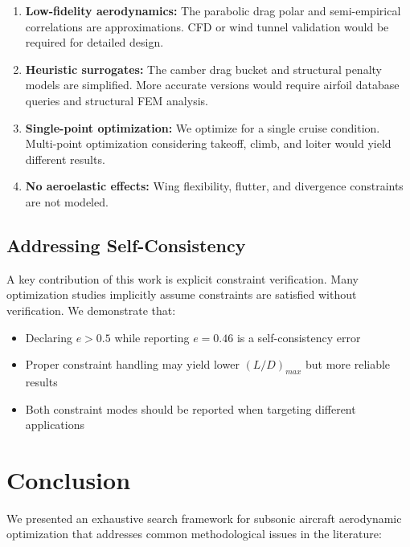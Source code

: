 \documentclass[11pt,a4paper]{article}
\begin{document}
\begin{enumerate}
    \item \textbf{Low-fidelity aerodynamics:} The parabolic drag polar and semi-empirical correlations are approximations. CFD or wind tunnel validation would be required for detailed design.
    
    \item \textbf{Heuristic surrogates:} The camber drag bucket and structural penalty models are simplified. More accurate versions would require airfoil database queries and structural FEM analysis.
    
    \item \textbf{Single-point optimization:} We optimize for a single cruise condition. Multi-point optimization considering takeoff, climb, and loiter would yield different results.
    
    \item \textbf{No aeroelastic effects:} Wing flexibility, flutter, and divergence constraints are not modeled.
\end{enumerate}

\subsection{Addressing Self-Consistency}

A key contribution of this work is explicit constraint verification. Many optimization studies implicitly assume constraints are satisfied without verification. We demonstrate that:

\begin{itemize}
    \item Declaring $e > 0.5$ while reporting $e = 0.46$ is a self-consistency error
    \item Proper constraint handling may yield lower $(L/D)_{max}$ but more reliable results
    \item Both constraint modes should be reported when targeting different applications
\end{itemize}

\section{Conclusion}

We presented an exhaustive search framework for subsonic aircraft aerodynamic optimization that addresses common methodological issues in the literature:
\end{document}

